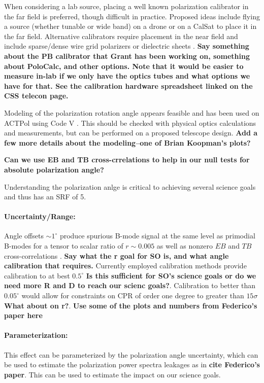 When considering a lab source, placing a well known polarization
calibrator in the far field is preferred, though difficult in practice.
Proposed ideas include flying a source (whether tunable or wide band) on a
drone or on a CalSat to place it in the far field. Alternative calibrators
require placement in the near field and include sparse/dense wire grid
polarizers or dielectric sheets \cite{Takahashi2010, 2016arXiv160701825K}. \textbf{Say something about the PB calibrator that Grant has been working on, something about PoloCalc, and other options. Note that it would be easier to measure in-lab if we only have the optics tubes and what options we have for that. See the calibration hardware spreadsheet linked on the CSS telecon page.}

Modeling of the polarization rotation angle appears feasible and has been used
on ACTPol using Code V \cite{2016arXiv160701825K}. This should be checked with
physical optics calculations and measurements, but can be performed on a proposed telescope
design. \textbf{Add a few more details about the modeling--one of Brian Koopman's plots?}

\textbf{Can we use EB and TB cross-crrelations to help in our null tests for absolute polarization angle?}

Understanding the polarization anlge is critical to achieving several science goals and thus has an SRF of 5.

\paragraph{Uncertainty/Range:}

Angle offsets $\sim 1^{\circ}$ produce spurious B-mode signal at the same level
as primodial B-modes for a tensor to scalar ratio of $r \sim 0.005$ as well as
nonzero $EB$ and $TB$ cross-correlations \cite{doi:10.1142/S0218271816400125}. \textbf{Say what the r goal for SO is, and what angle calibration that requires.}
Currently employed calibration methods provide calibration to at best
$0.5^{\circ}$ \cite{2016MNRAS.455.1981K} \textbf{Is this sufficient for SO's science goals or do we need more R and D to reach our scienc goals?}. Calibration to better than
$0.05^{\circ}$ would allow for constraints on CPR of order one degree to
greater than $15\sigma$ \cite{2016MNRAS.455.1981K} \textbf{What about on r?}.  \textbf{Use some of the plots and numbers from Federico's paper here}

\paragraph{Parameterization:}
This effect can be parameterized by the polarization angle uncertainty, which can be used to estimate the polarization power spectra leakages as in \textbf{cite Federico's paper}. This can be used to estimate the impact on our science goals.
